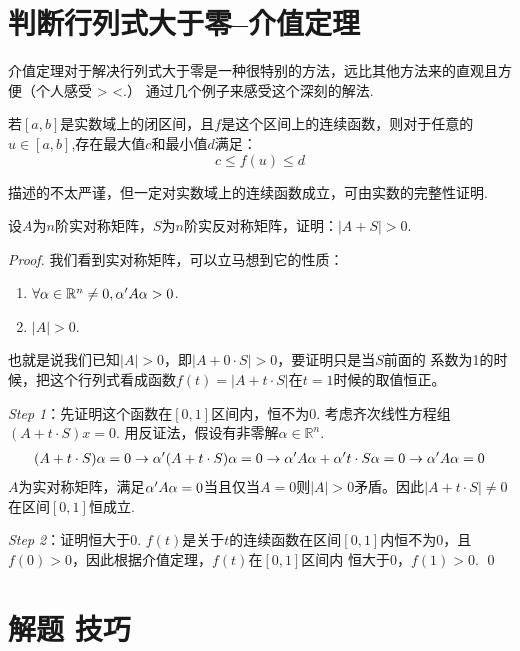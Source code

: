 \section{判断行列式大于零--介值定理}

介值定理对于解决行列式大于零是一种很特别的方法，远比其他方法来的直观且方便（个人感受 > <.）
通过几个例子来感受这个深刻的解法.

\begin{theorem}[介值定理]
	若$[a,b]$是实数域上的闭区间，且$f$是这个区间上的连续函数，则对于任意的$u \in [a,b]$,存在最大值$c$和最小值$d$满足：
	$$
		c \leq f(u) \leq d
	$$
\end{theorem}

描述的不太严谨，但一定对实数域上的连续函数成立，可由实数的完整性证明.

\begin{proposition}
	设$A$为$n$阶实对称矩阵，$S$为$n$阶实反对称矩阵，证明：$\vert A + S \vert > 0$.
\end{proposition}

\begin{proof}
	我们看到实对称矩阵，可以立马想到它的性质：
	\begin{enumerate}
		\item $\forall \alpha \in \mathbb{R}^n \neq 0, \alpha^\prime A \alpha >0$.
		\item $\vert A \vert > 0$.
	\end{enumerate}
	也就是说我们已知$\vert A \vert >0$，即$\vert A + 0 \cdot S \vert >0$，要证明只是当$S$前面的
	系数为1的时候，把这个行列式看成函数$f(t) = \vert A + t \cdot S \vert$在$t=1$时候的取值恒正。
	
	\emph{Step 1}：先证明这个函数在$[0,1]$区间内，恒不为0. 考虑齐次线性方程组$(A+t\cdot S)x=0$.
	用反证法，假设有非零解$\alpha \in \mathbb{R}^n$.
	\begin{align*}
		(A + t\cdot S) \alpha = 0 \to \alpha^\prime (A + t\cdot S) \alpha=0 \to 
		\alpha^\prime A \alpha + \alpha^\prime t\cdot S \alpha=0 \to \alpha^\prime A \alpha=0
	\end{align*}
	$A$为实对称矩阵，满足$\alpha^\prime A \alpha=0$当且仅当$A=0$则$\vert A \vert >0$矛盾。因此$\vert A + t \cdot S \vert \neq 0$在区间$[0,1]$恒成立.

	\emph{Step 2}：证明恒大于0.
	$f(t)$是关于$t$的连续函数在区间$[0,1]$内恒不为0，且$f(0)>0$，因此根据介值定理，$f(t)$在$[0,1]$区间内
	恒大于0，$f(1)>0$.
	\qed
\end{proof}

\section{解题 技巧}

